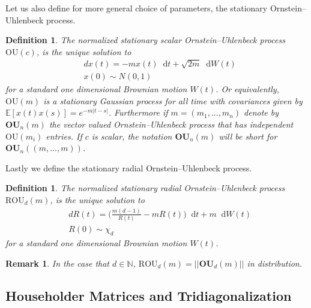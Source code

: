 \documentclass{amsart}
\newtheorem{defn}[thm]{Definition}
\newtheorem{rmk}[thm]{Remark}
\numberwithin{equation}{section}
\newcommand{\E}{\mathbb{E}}
\newcommand*\dif{\mathop{}\!\mathrm{d}}
\begin{document}
Let us also define for more general choice of parameters, the stationary Ornstein--Uhlenbeck process.
\begin{defn}\label{Ornstein-Uhlenbeck Process}
    The normalized stationary scalar Ornstein--Uhlenbeck process $\mathrm{OU}(c)$, is the unique solution to
    \begin{equation}\label{Stationary Scalar Ornstein Uhlenbeck process SDE}
    \begin{split}
        &dx(t)=-m x(t)\dif{t} +\sqrt{2m} \dif{W(t)} \\
        &x(0) \sim N(0,1)
    \end{split}
\end{equation}
for a standard one dimensional Brownian motion $W(t)$. Or equivalently, $\mathrm{OU}(m)$ is a stationary Gaussian process for all time with covariances given by $\E[x(t)x(s)]=e^{-m|t-s|}$. Furthermore if $m=(m_1,...,m_n)$ denote by $\mathbf{OU}_n(m)$ the vector valued Ornstein--Uhlenbeck process that has independent $\mathrm{OU}(m_i)$ entries. If $c$ is scalar, the notation $\mathbf{OU}_n(m)$ will be short for $\mathbf{OU}_n((m,...,m))$.
\end{defn}

Lastly we define the stationary radial Ornstein--Uhlenbeck process.

\begin{defn}
    The normalized stationary radial Ornstein--Uhlenbeck process $\mathrm{ROU}_d(m)$, is the unique solution to 
    \begin{equation}\label{Stationary Radial Ornstein Uhlenbeck process SDE}
    \begin{split}
        &dR(t)=\bigg(\frac{m(d-1)}{R(t)}-mR(t)\bigg)\dif{t} +m \dif{W(t)} \\
        &R(0) \sim \chi_d
    \end{split}
\end{equation}
for a standard one dimensional Brownian motion $W(t)$.
\end{defn}

\begin{rmk}
    In the case that $d \in \mathbb{N}$, $\mathrm{ROU}_d(m)=||\mathbf{OU}_d(m)||$ in distribution.
\end{rmk}

\subsection{Householder Matrices and Tridiagonalization}\label{Householder and Tridiag Section}
\end{document}
